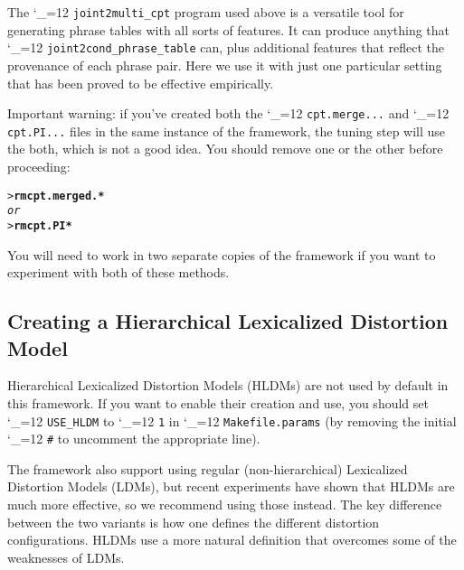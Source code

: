 \documentclass[11pt,letterpaper]{article}
\def\code{\begingroup\catcode`\_=12 \codex}
\newcommand{\codex}[1]{\texttt{#1}\endgroup}
\begin{document}
The \code{joint2multi_cpt} program used above is a versatile tool for
generating phrase tables with all sorts of features.  It can produce anything
that \code{joint2cond_phrase_table} can, plus additional features that reflect
the provenance of each phrase pair.  Here we use it with just one particular
setting that has been proved to be effective empirically.

Important warning: if you've created both the \code{cpt.merge...} and
\code{cpt.PI...} files in the same instance of the framework, the tuning step
will use the both, which is not a good idea.  You should remove one or the
other before proceeding:
\begin{small}
\begin{alltt}
   > \textbf{rm cpt.merged.*}
\emph{or}
   > \textbf{rm cpt.PI*}
\end{alltt}
\end{small}
You will need to work in two separate copies of the framework if you want to
experiment with both of these methods.

\subsection{Creating a Hierarchical Lexicalized Distortion Model} \label{LDM}

Hierarchical Lexicalized Distortion Models (HLDMs) are not used by default in this
framework.  If you want to enable their creation and use, you should set
\code{USE_HLDM} to \code{1} in \code{Makefile.params} (by removing the initial
\code{\#} to uncomment the appropriate line).

The framework also support using regular (non-hierarchical) Lexicalized
Distortion Models (LDMs), but recent experiments have shown that HLDMs are much
more effective, so we recommend using those instead.  The key difference between
the two variants is how one defines the different distortion configurations.
HLDMs use a more natural definition that overcomes some of the weaknesses of
LDMs.
\end{document}
